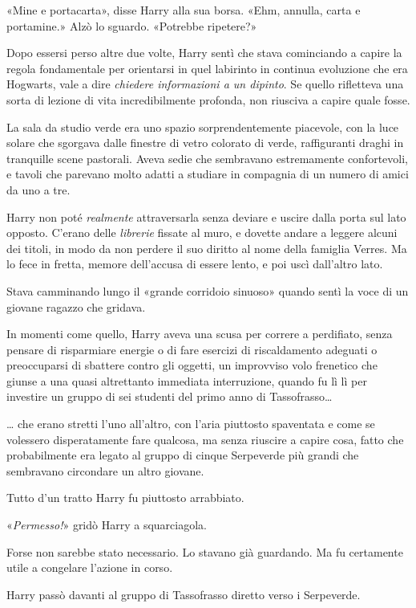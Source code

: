 «Mine e portacarta», disse Harry alla sua borsa. «Ehm, annulla, carta e portamine.» Alzò lo sguardo. «Potrebbe ripetere?»

Dopo essersi perso altre due volte, Harry sentì che stava cominciando a capire la regola fondamentale per orientarsi in quel labirinto in continua evoluzione che era Hogwarts, vale a dire \textit{chiedere informazioni a un dipinto}. Se quello rifletteva una sorta di lezione di vita incredibilmente profonda, non riusciva a capire quale fosse.

La sala da studio verde era uno spazio sorprendentemente piacevole, con la luce solare che sgorgava dalle finestre di vetro colorato di verde, raffiguranti draghi in tranquille scene pastorali. Aveva sedie che sembravano estremamente confortevoli, e tavoli che parevano molto adatti a studiare in compagnia di un numero di amici da uno a tre.

Harry non poté \textit{realmente} attraversarla senza deviare e uscire dalla porta sul lato opposto. C’erano delle \textit{librerie} fissate al muro, e dovette andare a leggere alcuni dei titoli, in modo da non perdere il suo diritto al nome della famiglia Verres. Ma lo fece in fretta, memore dell’accusa di essere lento, e poi uscì dall’altro lato.

Stava camminando lungo il «grande corridoio sinuoso» quando sentì la voce di un giovane ragazzo che gridava.

In momenti come quello, Harry aveva una scusa per correre a perdifiato, senza pensare di risparmiare energie o di fare esercizi di riscaldamento adeguati o preoccuparsi di sbattere contro gli oggetti, un improvviso volo frenetico che giunse a una quasi altrettanto immediata interruzione, quando fu lì lì per investire un gruppo di sei studenti del primo anno di Tassofrasso…

… che erano stretti l’uno all’altro, con l’aria piuttosto spaventata e come se volessero disperatamente fare qualcosa, ma senza riuscire a capire cosa, fatto che probabilmente era legato al gruppo di cinque Serpeverde più grandi che sembravano circondare un altro giovane.

Tutto d’un tratto Harry fu piuttosto arrabbiato.

«\textit{Permesso!}» gridò Harry a squarciagola.

Forse non sarebbe stato necessario. Lo stavano già guardando. Ma fu certamente utile a congelare l’azione in corso.

Harry passò davanti al gruppo di Tassofrasso diretto verso i Serpeverde.

